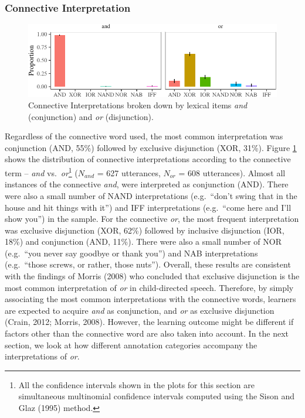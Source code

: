 \documentclass[
  english,
  ,man,floatsintext]{apa6}
\begin{document}
\hypertarget{connective-interpretation}{%
\subsubsection{Connective Interpretation}\label{connective-interpretation}}

\begin{figure}[tb]

{\centering \includegraphics{figs/interpretationPlot-1} 

}

\caption{Connective Interpretations broken down by lexical items \textit{and} (conjunction) and \textit{or} (disjunction).}\label{fig:interpretationPlot}
\end{figure}

Regardless of the connective word used, the most common interpretation was conjunction (AND, 55\%) followed by exclusive disjunction (XOR, 31\%). Figure \ref{fig:interpretationPlot} shows the distribution of connective interpretations according to the connective term -- \emph{and} vs.~\emph{or}\footnote{All the confidence intervals shown in the plots for this section are simultaneous multinomial confidence intervals computed using the Sison and Glaz (1995) method.} (\(N_{and}\) = 627 utterances, \(N_{or}\) = 608 utterances). Almost all instances of the connective \emph{and}, were interpreted as conjunction (AND). There were also a small number of NAND interpretations (e.g.~``don't swing that in the house and hit things with it'') and IFF interpretations (e.g.~``come here and I'll show you'') in the sample. For the connective \emph{or}, the most frequent interpretation was exclusive disjunction (XOR, 62\%) followed by inclusive disjunction (IOR, 18\%) and conjunction (AND, 11\%). There were also a small number of NOR (e.g.~``you never say goodbye or thank you'') and NAB interpretations (e.g.~``those screws, or rather, those nuts''). Overall, these results are consistent with the findings of Morris (2008) who concluded that exclusive disjunction is the most common interpretation of \emph{or} in child-directed speech. Therefore, by simply associating the most common interpretations with the connective words, learners are expected to acquire \emph{and} as conjunction, and \emph{or} as exclusive disjunction (Crain, 2012; Morris, 2008). However, the learning outcome might be different if factors other than the connective word are also taken into account. In the next section, we look at how different annotation categories accompany the interpretations of \emph{or}.
\end{document}
